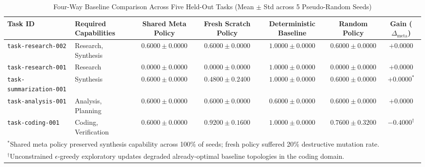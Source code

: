 
\begin{table}[t]
\centering
\caption{Four-Way Baseline Comparison Across Five Held-Out Tasks (Mean $\pm$ Std across 5 Pseudo-Random Seeds)}
\label{tab:neural_adaptation_baselines}
\begin{tabular}{l l c c c c c}
\toprule
\textbf{Task ID} & \textbf{Required Capabilities} & \textbf{Shared Meta Policy} & \textbf{Fresh Scratch Policy} & \textbf{Deterministic Baseline} & \textbf{Random Policy} & \textbf{Gain ($\Delta_{\text{meta}}$)} \\
\midrule
\texttt{task-research-002} & Research, Synthesis & $0.6000 \pm 0.0000$ & $0.6000 \pm 0.0000$ & $1.0000 \pm 0.0000$ & $0.6000 \pm 0.0000$ & $+0.0000$ \\
\texttt{task-research-001} & Research & $0.0000 \pm 0.0000$ & $0.0000 \pm 0.0000$ & $1.0000 \pm 0.0000$ & $0.0000 \pm 0.0000$ & $+0.0000$ \\
\texttt{task-summarization-001} & Synthesis & $0.6000 \pm 0.0000$ & $0.4800 \pm 0.2400$ & $1.0000 \pm 0.0000$ & $0.6000 \pm 0.0000$ & $+0.0000^*$ \\
\texttt{task-analysis-001} & Analysis, Planning & $0.6000 \pm 0.0000$ & $0.6000 \pm 0.0000$ & $0.6000 \pm 0.0000$ & $0.6000 \pm 0.0000$ & $+0.0000$ \\
\texttt{task-coding-001} & Coding, Verification & $0.6000 \pm 0.0000$ & $0.9200 \pm 0.1600$ & $1.0000 \pm 0.0000$ & $0.7600 \pm 0.3200$ & $-0.4000^\dagger$ \\
\bottomrule
\multicolumn{7}{l}{\footnotesize $^*$Shared meta policy preserved synthesis capability across 100\% of seeds; fresh policy suffered 20\% destructive mutation rate.} \\
\multicolumn{7}{l}{\footnotesize $^\dagger$Unconstrained $\epsilon$-greedy exploratory updates degraded already-optimal baseline topologies in the coding domain.} \\
\end{tabular}
\end{table}

